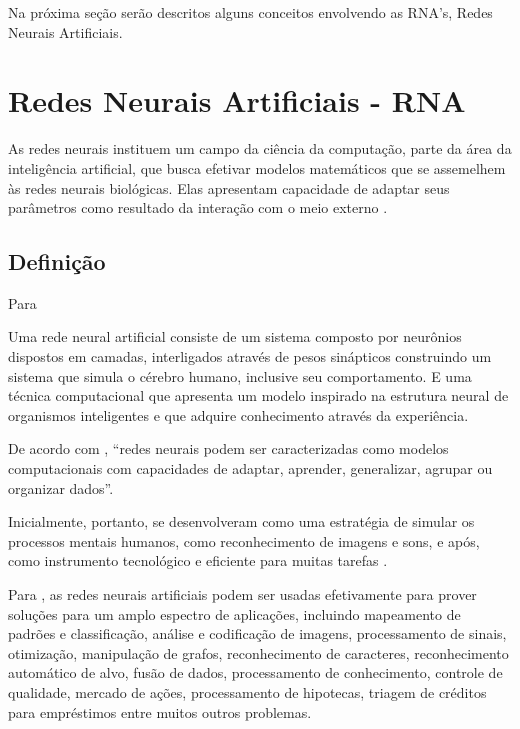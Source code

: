 Na próxima seção serão descritos alguns conceitos envolvendo as RNA's, Redes Neurais Artificiais.

\section{Redes Neurais Artificiais - RNA}
As redes neurais instituem um campo da ciência da computação, parte da área da inteligência artificial, que busca efetivar modelos matemáticos que se assemelhem às redes neurais biológicas. Elas apresentam capacidade de adaptar seus parâmetros como resultado da interação com o meio externo \cite{ferneda_redes_2006}\cite{Norvig2013}.

\subsection{Definição}

Para  
\begin{citacao}
	Uma rede neural artificial consiste de um sistema composto por neurônios dispostos em camadas, interligados através de pesos sinápticos construindo um sistema que simula o cérebro humano, inclusive seu comportamento. E uma técnica computacional que apresenta um modelo inspirado na estrutura neural de organismos inteligentes e que adquire conhecimento através da experiência.
\end{citacao}

De acordo com , ``redes neurais podem ser caracterizadas como modelos computacionais com capacidades de adaptar, aprender, generalizar, agrupar ou organizar dados''.

Inicialmente, portanto, se desenvolveram como uma estratégia de simular os processos mentais humanos, como reconhecimento de imagens e sons, e após, como instrumento tecnológico e eficiente para muitas tarefas \cite{jin_development_2002}.	

Para , as redes neurais artificiais podem ser usadas efetivamente para prover soluções para um amplo espectro de aplicações, incluindo mapeamento de padrões e classificação, análise e codificação de imagens, processamento de sinais, otimização, manipulação de grafos, reconhecimento de caracteres, reconhecimento automático de alvo,  	fusão de dados, processamento de conhecimento, controle de qualidade, mercado de ações, processamento de hipotecas, triagem de créditos para empréstimos entre muitos outros problemas. 

